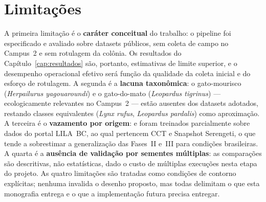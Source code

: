 \section{Limitações}
\label{sec:conclusao-limitacoes}

A primeira limitação é o \textbf{caráter conceitual} do trabalho: o pipeline foi especificado e avaliado sobre datasets públicos, sem coleta de campo no Campus~2 e sem rotulagem da colônia. Os resultados do Capítulo~\ref{cap:resultados} são, portanto, estimativas de limite superior, e o desempenho operacional efetivo será função da qualidade da coleta inicial e do esforço de rotulagem. A segunda é a \textbf{lacuna taxonômica}: o gato-mourisco (\emph{Herpailurus yagouaroundi}) e o gato-do-mato (\emph{Leopardus tigrinus}) --- ecologicamente relevantes no Campus~2 --- estão ausentes dos datasets adotados, restando classes equivalentes (\emph{Lynx rufus}, \emph{Leopardus pardalis}) como aproximação. A terceira é o \textbf{vazamento por origem}: \modeloMD{} e \modeloSN{} foram treinados parcialmente sobre dados do portal LILA~BC, ao qual pertencem CCT e Snapshot Serengeti, o que tende a sobrestimar a generalização das Fases~II e~III para condições brasileiras. A quarta é a \textbf{ausência de validação por sementes múltiplas}: as comparações são descritivas, não estatísticas, dado o custo de múltiplas execuções nesta etapa do projeto. As quatro limitações são tratadas como condições de contorno explícitas; nenhuma invalida o desenho proposto, mas todas delimitam o que esta monografia entrega e o que a implementação futura precisa entregar.
